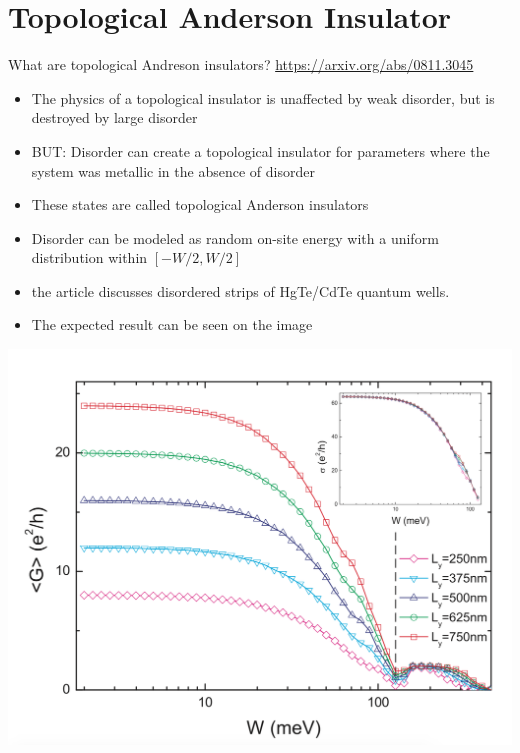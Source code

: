 \documentclass[12pt]{article}
\numberwithin{equation}{section}
\begin{document}
\newpage
\section{Topological Anderson Insulator}
What are topological Andreson insulators?
\url{https://arxiv.org/abs/0811.3045}


\begin{minipage}[c]{0.45\textwidth}
  \begin{itemize}
    \item The physics of a topological insulator is unaffected by weak
    disorder, but is destroyed by large disorder
    \item BUT: Disorder can create a topological insulator for parameters where the system was metallic in 
    the absence of disorder
    \item These states are called topological Anderson insulators
    \item Disorder can be modeled as random on-site energy with a uniform distribution within $[-W/2, W/2]$
    \item the article discusses disordered strips of HgTe/CdTe quantum wells.
    \item The expected result can be seen on the image
  \end{itemize}
\end{minipage}
\hfill
\begin{minipage}[c]{0.5\textwidth}
  \includegraphics[width=\textwidth]{./media/expected-result.png}
\end{minipage}

\newpage
\end{document}
